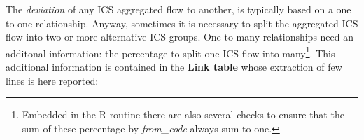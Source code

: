 \documentclass[nojss]{jss}
\begin{document}
The \textit{deviation} of any ICS aggregated flow to another, is typically based on a one to one relationship. Anyway, sometimes it is necessary to split the aggregated ICS flow into two or more alternative ICS groups. One to many relationships need an additonal information: the percentage to split one ICS flow into many\footnote{Embedded in the R routine there are also several checks to ensure that the sum of these percentage by \textit{from_code} always sum to one. }.  This additional information is contained in the \textbf{Link table} whose extraction of few lines is here reported:
\end{document}
